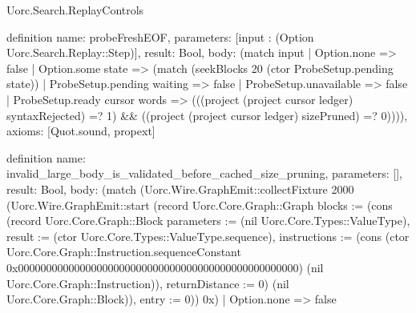 \begin{lexlean}{Uorc.Search.ReplayControls}
\begin{semanticmodule}
definition{
  name: probeFreshEOF,
  parameters: [input : (Option Uorc.Search.Replay::Step)],
  result: Bool,
  body: (match input
    | Option.none => false
    | Option.some state => (match (seekBlocks 20 (ctor ProbeSetup.pending state))
      | ProbeSetup.pending waiting => false
      | ProbeSetup.unavailable => false
      | ProbeSetup.ready cursor words => (((project (project cursor ledger) syntaxRejected) =? 1) && ((project (project cursor ledger) sizePruned) =? 0)))),
  axioms: [Quot.sound, propext]
}

definition{
  name: invalid_large_body_is_validated_before_cached_size_pruning,
  parameters: [],
  result: Bool,
  body: (match (Uorc.Wire.GraphEmit::collectFixture 2000 (Uorc.Wire.GraphEmit::start (record Uorc.Core.Graph::Graph {blocks := (cons (record Uorc.Core.Graph::Block {parameters := (nil Uorc.Core.Types::ValueType), result := (ctor Uorc.Core.Types::ValueType.sequence), instructions := (cons (ctor Uorc.Core.Graph::Instruction.sequenceConstant 0x00000000000000000000000000000000000000000000000000) (nil Uorc.Core.Graph::Instruction)), returnDistance := 0}) (nil Uorc.Core.Graph::Block)), entry := 0})) 0x)
    | Option.none => false
}
\end{semanticmodule}
\end{lexlean}
